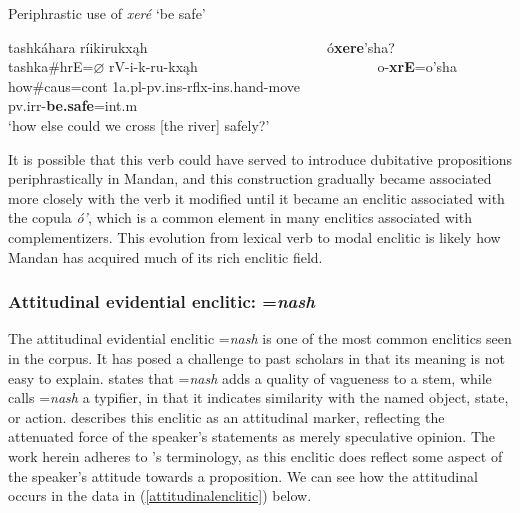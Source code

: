 \begin{exe}

\item\label{auxiliaryo'xere} Periphrastic use of \textit{xeré} `be safe'

	\glll tashkáhara ríikirukxąh ~ ~ ~ ~ ~ ~ ~ ~ ~ ~ ~ ~ ~ ~ ~  ó\textbf{xere}'sha?\\
	tashka\#hrE=$\varnothing$ rV-i-k-ru-kxąh ~ ~ ~ ~ ~ ~ ~ ~ ~ ~ ~ ~ ~ ~ ~ o-\textbf{xrE}=o'sha\\
	\textnormal{how}\#caus=cont 1a.pl-pv.ins-rflx-ins.hand-\textnormal{move} ~ ~ ~ ~ ~ ~ ~ ~ ~ ~ ~ ~ ~ ~ ~ pv.irr-\textbf{\textnormal{be.safe}}=int.m\\
	\glt `how else could we cross [the river] safely?' \citep[269]{hollow1973b}

\end{exe}

It is possible that this verb could have served to introduce dubitative propositions periphrastically in Mandan, and this construction gradually became associated more closely with the verb it modified until it became an enclitic associated with the copula \textit{ó'}, which is a common element in many enclitics associated with  complementizers. This evolution from lexical verb to modal enclitic is likely how Mandan has acquired much of its rich enclitic field.

\subsubsection{Attitudinal evidential enclitic: =\textit{nash}}
\largerpage
The attitudinal evidential enclitic =\textit{nash} is one of the most common enclitics seen in the corpus. It has posed a challenge to past scholars in that its meaning is not easy to explain. \citet[23]{kennard1936} states that =\textit{nash} adds a quality of vagueness to a stem, while \citet[467]{hollow1970} calls =\textit{nash} a typifier, in that it indicates similarity with the named object, state, or action. \citet[35]{mixco1997a} describes this enclitic as an attitudinal marker, reflecting the attenuated force of the speaker's statements as merely speculative opinion. The work herein adheres to \citeauthor{mixco1997a}'s terminology, as this enclitic does reflect some aspect of the speaker's attitude towards a proposition. We can see how the attitudinal occurs in the data in (\ref{attitudinalenclitic}) below.

